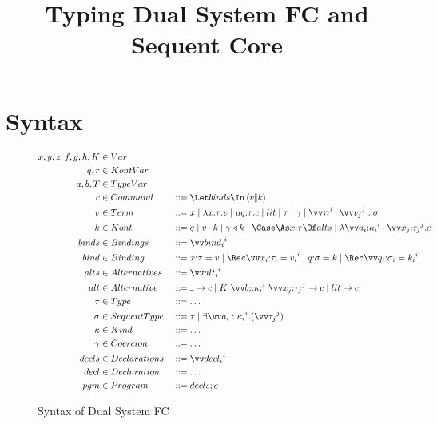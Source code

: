 \documentclass{article}
\begin{document}
\title{Typing Dual System FC and Sequent Core}

\maketitle

\section{Syntax}
\label{sec:syntax}

\begin{figure}[h]
\centering
\begin{gather*}
\begin{aligned}
  x, y, z, f, g, h, K &\in Var
  \\
  q, r &\in KontVar
  \\
  a, b, T &\in TypeVar
  \\
  \com &\in Command
  &
  &::= \mcut{\tm}{\ko}{\binds}
  \\
  \tm &\in Term
  &
  &::= x
  \Alt \fn{\ann x \ty} \tm
  \Alt \compute{\ann q \ty} \com
  \Alt \lit
  \Alt \ty
  \Alt \cn
  \Alt \packs[\sty]{\vect[i]{\ty_i}}{\vect[j]{\tm_j}}
  \\
  \ko &\in Kont
  &
  &::= q
  \Alt \app{\tm}{\ko}
  \Alt \koerce{\cn}{\ko}
  \Alt \caseas{\ann x \ty}{\alts}
  \Alt \fnk{\packs{\vect[i]{\ann{a_i}{\ki_i}}}{\vect[j]{\ann{x_j}{\ty_j}}}}{\com}
  \\
  \binds &\in Bindings
  &
  &::= \vect[i]{\abind_i}
  \\
  \abind &\in Binding
  &
  &::= \bind{\ann x \ty}{\tm}
  \Alt \Rec \vect[i]{\bind{\ann{x_i}{\ty_i}}{\tm_i}}
  \Alt \bind{\ann q \sty}{\ko}
  \Alt \Rec \vect[i]{\bind{\ann{q_i}{\sty_i}}{\ko_i}}
  \\
  \alts &\in Alternatives
  &
  &::= \vect[i]{\analt_i}
  \\
  \analt &\in Alternative
  &
  &::= \alt{\blank}{\com}
  \Alt \alt{K ~ \vect[i]{\ann{b_i}{\ki_i}} ~ \vect[j]{\ann{x_j}{\ty_j}}}{\com}
  \Alt \alt{\lit}{\com}
  \\
  \ty &\in Type
  &
  &::= \dots
  \\
  \sty &\in SequentType
  &
  &::= \ty
  \Alt \stackty{\vect[i]{a_i:\ki_i}}{\vect[j]{\ty_j}}
  \\
  \ki &\in Kind
  &
  &::= \dots
  \\
  \cn &\in Coercion
  &
  &::= \dots
  \\
  \decls &\in Declarations
  &
  &::= \vect[i]{\decl_i}
  \\
  \decl &\in Declaration
  &
  &::= \dots
  \\
  \pgm &\in Program
  &
  &::= \decls; \com
\end{aligned}
\end{gather*}
\caption{Syntax of Dual System FC}
\label{fig:dual-fc-syntax}
\end{figure}
\end{document}

